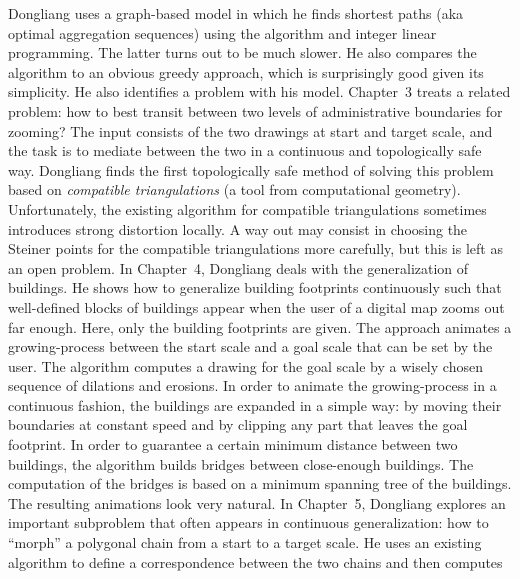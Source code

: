 {Dongliang uses a graph-based model in which he finds shortest paths
(aka optimal aggregation sequences) using the \Astar algorithm
and integer linear programming. The latter turns out to be much slower.
He also compares the \Astar algorithm to an obvious greedy
approach, which is surprisingly good given its simplicity.  He also
identifies a problem with his model.
%
\newline\indent
%
Chapter~3 treats a related problem: how to best transit between
two levels of administrative boundaries for zooming?  The
input consists of the two drawings at start and target scale, and
the task is to mediate between the two in a continuous and
topologically safe way. 
Dongliang finds the first
topologically safe method of solving this problem based on
\emph{compatible triangulations} (a tool from computational
geometry).  Unfortunately, the existing algorithm for compatible
triangulations sometimes introduces strong distortion locally.  A
way out may consist in choosing the Steiner points for the
compatible triangulations more carefully, but this is left as an
open problem.
%
\newline\indent
%
In Chapter~4, Dongliang deals with the generalization of buildings.
He shows how to generalize building footprints continuously such
that well-defined blocks of buildings appear when the user of a
digital map zooms out far enough.  Here, only the building
footprints are given.  The approach animates a growing-process
between the start scale and a goal scale that can be set by the
user.  The algorithm computes a drawing for the goal scale by a
wisely chosen sequence of dilations and erosions.
In order to animate the
growing-process in a continuous fashion, the buildings are expanded
in a simple way: by moving their boundaries at constant speed and by
clipping any part that leaves the goal footprint.  In order to
guarantee a certain minimum distance between two buildings, the
algorithm builds bridges between close-enough buildings.  
The computation of the bridges is based on 
a minimum spanning tree of the buildings.  
The resulting animations look very natural.
%
\newline\indent
%
In Chapter~5, Dongliang explores an important subproblem that often
appears in continuous generalization: how to ``morph'' a polygonal
chain from a start to a target scale.  He uses an existing algorithm
to define a correspondence between the two chains and then computes
}
